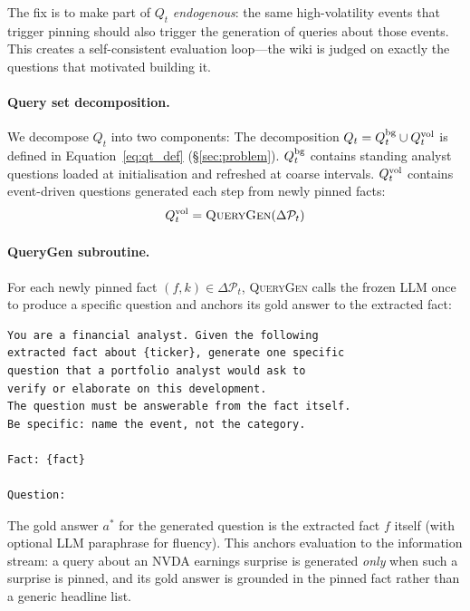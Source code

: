 \documentclass{article}
\begin{document}
The fix is to make part of $Q_t$ \emph{endogenous}: the same high-volatility events that trigger pinning should also trigger the generation of queries about those events.
This creates a self-consistent evaluation loop---the wiki is judged on exactly the questions that motivated building it.

\paragraph{Query set decomposition.}
We decompose $Q_t$ into two components:
The decomposition $Q_t = Q_t^{\textup{bg}} \cup Q_t^{\textup{vol}}$ is defined in Equation~\eqref{eq:qt_def} (\S\ref{sec:problem}).
$Q_t^{\textup{bg}}$ contains standing analyst questions loaded at initialisation and refreshed at coarse intervals.
$Q_t^{\textup{vol}}$ contains event-driven questions generated each step from newly pinned facts:
\begin{equation}
  Q_t^{\textup{vol}} = \textsc{QueryGen}(\Delta\mathcal{P}_t)
  \label{eq:qtgen}
\end{equation}

\paragraph{QueryGen subroutine.}
For each newly pinned fact $(f, k) \in \Delta\mathcal{P}_t$, \textsc{QueryGen} calls the frozen LLM once to produce a specific question and anchors its gold answer to the extracted fact:

\begin{lstlisting}
You are a financial analyst. Given the following
extracted fact about {ticker}, generate one specific
question that a portfolio analyst would ask to
verify or elaborate on this development.
The question must be answerable from the fact itself.
Be specific: name the event, not the category.

Fact: {fact}

Question:
\end{lstlisting}

The gold answer $a^*$ for the generated question is the extracted fact $f$ itself (with optional LLM paraphrase for fluency).
This anchors evaluation to the information stream: a query about an NVDA earnings surprise is generated \emph{only} when such a surprise is pinned, and its gold answer is grounded in the pinned fact rather than a generic headline list.
\end{document}
